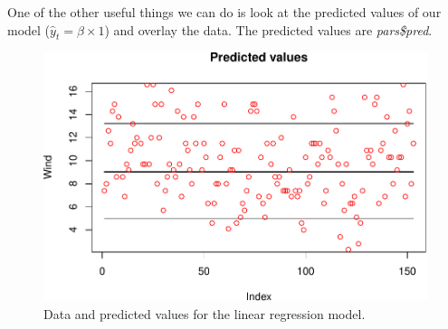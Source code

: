 \documentclass[
]{article}
\newenvironment{Shaded}{\begin{snugshade}}{\end{snugshade}}
\newcommand{\DataTypeTok}[1]{\textcolor[rgb]{0.13,0.29,0.53}{#1}}
\newcommand{\DecValTok}[1]{\textcolor[rgb]{0.00,0.00,0.81}{#1}}
\newcommand{\FloatTok}[1]{\textcolor[rgb]{0.00,0.00,0.81}{#1}}
\newcommand{\KeywordTok}[1]{\textcolor[rgb]{0.13,0.29,0.53}{\textbf{#1}}}
\newcommand{\NormalTok}[1]{#1}
\newcommand{\OperatorTok}[1]{\textcolor[rgb]{0.81,0.36,0.00}{\textbf{#1}}}
\newcommand{\StringTok}[1]{\textcolor[rgb]{0.31,0.60,0.02}{#1}}
\begin{document}
One of the other useful things we can do is look at the predicted values
of our model (\(\hat{y}_t=\beta \times 1\)) and overlay the data. The
predicted values are \emph{pars\$pred}.

\begin{Shaded}
\end{Shaded}

\begin{figure}

{\centering \includegraphics[width=0.8\linewidth]{fitting-models-with-stan_files/figure-latex/stan-fig-lm-1} 

}

\caption{Data and predicted values for the linear regression model.}\label{fig:stan-fig-lm}
\end{figure}
\end{document}
